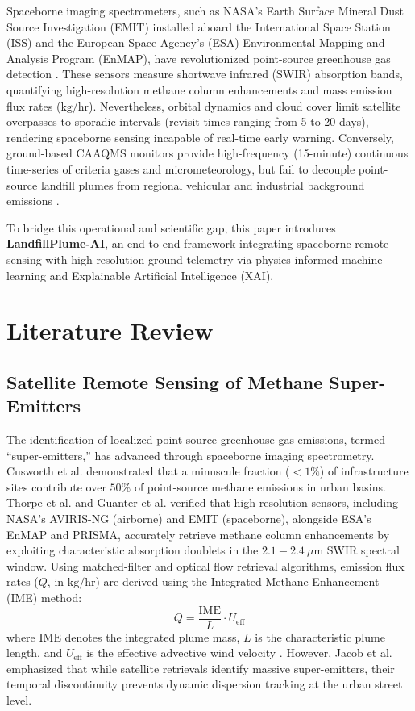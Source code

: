 \documentclass[conference]{IEEEtran}
\begin{document}
Spaceborne imaging spectrometers, such as NASA's Earth Surface Mineral Dust Source Investigation (EMIT) installed aboard the International Space Station (ISS) and the European Space Agency's (ESA) Environmental Mapping and Analysis Program (EnMAP), have revolutionized point-source greenhouse gas detection \cite{cusworth2020strong, thorpe2023attribution}. These sensors measure shortwave infrared (SWIR) absorption bands, quantifying high-resolution methane column enhancements and mass emission flux rates ($\text{kg/hr}$). Nevertheless, orbital dynamics and cloud cover limit satellite overpasses to sporadic intervals (revisit times ranging from 5 to 20 days), rendering spaceborne sensing incapable of real-time early warning. Conversely, ground-based CAAQMS monitors provide high-frequency (15-minute) continuous time-series of criteria gases and micrometeorology, but fail to decouple point-source landfill plumes from regional vehicular and industrial background emissions \cite{guttikunda2014nature}.

To bridge this operational and scientific gap, this paper introduces \textbf{LandfillPlume-AI}, an end-to-end framework integrating spaceborne remote sensing with high-resolution ground telemetry via physics-informed machine learning and Explainable Artificial Intelligence (XAI).

\section{Literature Review}
\subsection{Satellite Remote Sensing of Methane Super-Emitters}
The identification of localized point-source greenhouse gas emissions, termed ``super-emitters,'' has advanced through spaceborne imaging spectrometry. Cusworth et al. \cite{cusworth2020strong} demonstrated that a minuscule fraction ($<1\%$) of infrastructure sites contribute over $50\%$ of point-source methane emissions in urban basins. Thorpe et al. \cite{thorpe2023attribution} and Guanter et al. \cite{guanter2023environmental} verified that high-resolution sensors, including NASA's AVIRIS-NG (airborne) and EMIT (spaceborne), alongside ESA's EnMAP and PRISMA, accurately retrieve methane column enhancements by exploiting characteristic absorption doublets in the $2.1 - 2.4\ \mu\text{m}$ SWIR spectral window. Using matched-filter and optical flow retrieval algorithms, emission flux rates ($Q$, in $\text{kg/hr}$) are derived using the Integrated Methane Enhancement (IME) method:
\begin{equation}
Q = \frac{\text{IME}}{L} \cdot U_{\text{eff}}
\end{equation}
where $\text{IME}$ denotes the integrated plume mass, $L$ is the characteristic plume length, and $U_{\text{eff}}$ is the effective advective wind velocity \cite{frankenberg2016airborne}. However, Jacob et al. \cite{jacob2022quantifying} emphasized that while satellite retrievals identify massive super-emitters, their temporal discontinuity prevents dynamic dispersion tracking at the urban street level.
\end{document}
